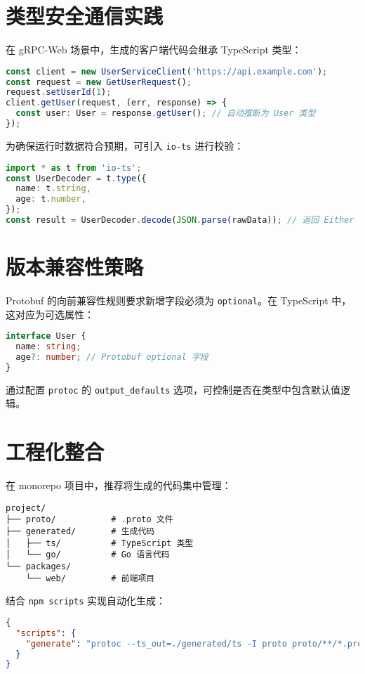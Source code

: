 \section{类型安全通信实践}
在 gRPC-Web 场景中，生成的客户端代码会继承 TypeScript 类型：\par
\begin{lstlisting}[language=typescript]
const client = new UserServiceClient('https://api.example.com');
const request = new GetUserRequest();
request.setUserId(1);
client.getUser(request, (err, response) => {
  const user: User = response.getUser(); // 自动推断为 User 类型
});
\end{lstlisting}
为确保运行时数据符合预期，可引入 \verb!io-ts! 进行校验：\par
\begin{lstlisting}[language=typescript]
import * as t from 'io-ts';
const UserDecoder = t.type({
  name: t.string,
  age: t.number,
});
const result = UserDecoder.decode(JSON.parse(rawData)); // 返回 Either 类型
\end{lstlisting}
\section{版本兼容性策略}
Protobuf 的向前兼容性规则要求新增字段必须为 \verb!optional!。在 TypeScript 中，这对应为可选属性：\par
\begin{lstlisting}[language=typescript]
interface User {
  name: string;
  age?: number; // Protobuf optional 字段
}
\end{lstlisting}
通过配置 \verb!protoc! 的 \verb!output_defaults! 选项，可控制是否在类型中包含默认值逻辑。\par
\section{工程化整合}
在 monorepo 项目中，推荐将生成的代码集中管理：\par
\begin{lstlisting}
project/
├── proto/           # .proto 文件
├── generated/       # 生成代码
│   ├── ts/          # TypeScript 类型
│   └── go/          # Go 语言代码
└── packages/
    └── web/         # 前端项目
\end{lstlisting}
结合 \verb!npm scripts! 实现自动化生成：\par
\begin{lstlisting}[language=json]
{
  "scripts": {
    "generate": "protoc --ts_out=./generated/ts -I proto proto/**/*.proto"
  }
}
\end{lstlisting}
